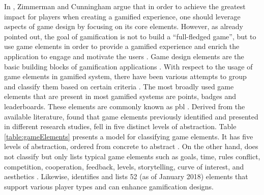 In \cite{zichermann2011gamification}, Zimmerman and Cunningham argue that in order to achieve the greatest impact for players when creating a gamified experience, one should leverage aspects of game design by focusing on its core elements. However, as already pointed out, the goal of gamification is not to build a ``full-fledged game'', but to use game elements in order to provide a gamified experience and enrich the application to engage and motivate the users \cite{deterding2011game, werbach2012win}. Game design elements are the basic building blocks of gamification applications \cite{deterding2011game, werbach2012win}. With respect to the usage of game elements in gamified system, there have been various attempts to group and classify them based on certain criteria \cite{deterding2011game, werbach2012win, kapp2012gamification, zichermann2011gamification}. The most broadly used game elements that are present in most gamified systems are points, badges and leaderboards. These elements are commonly known as \acrshort{pbl} \cite{werbach2012win}. Derived from the available literature, \cite{deterding2011game} found that game elements previously identified and presented in different research studies, fell in five distinct levels of abstraction. Table \ref{table:gameElements} presents a model for classifying game elements. It has five levels of abstraction, ordered from concrete to abstract \cite{deterding2011game}. On the other hand, \cite{kapp2012gamification} does not classify but only lists typical game elements such as goals, time, rules  conflict, competition, cooperation, feedback, levels,  storytelling, curve of interest, and aesthetics \cite{kapp2012gamification}. Likewise, \cite{50GamElements} identifies and lists 52 (as of January 2018) elements that support various player types and can enhance gamification designs.\\\\
